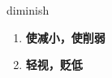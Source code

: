 
\begin{frame}
{\huge diminish}
\begin{center}
\begin{enumerate}\Large
  \item \textbf{使减小，使削弱}
  \item \textbf{轻视，贬低}
\end{enumerate}
\end{center}
\end{frame}
